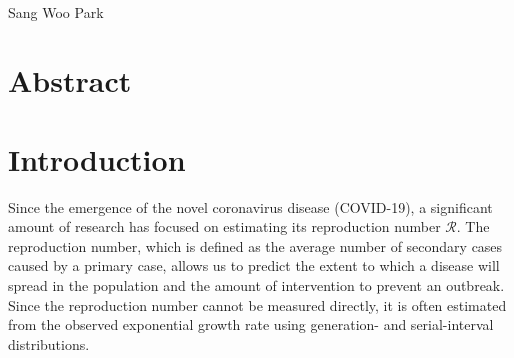\documentclass[12pt]{article}
\date{\today}
\begin{document}
\begin{flushleft}{
	\Large
	\textbf{}
}\\
Sang Woo Park
\end{flushleft}

\section*{Abstract}

\pagebreak


\section{Introduction}

Since the emergence of the novel coronavirus disease (COVID-19), a significant amount of research has focused on estimating its reproduction number $\mathcal R$.
The reproduction number, which is defined as the average number of secondary cases caused by a primary case, allows us to predict the extent to which a disease will spread in the population and the amount of intervention to prevent an outbreak.
Since the reproduction number cannot be measured directly, it is often estimated from the observed exponential growth rate using generation- and serial-interval distributions.
\end{document}

